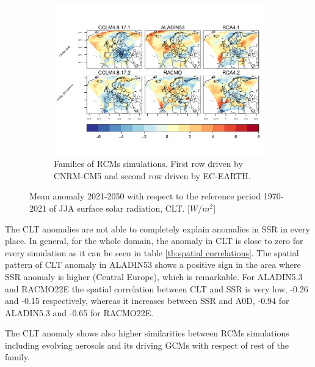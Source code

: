 \begin{figure}[h]
\begin{subfigure}{1\textwidth}
    \includegraphics[width=1\textwidth]{figs/capitulo7/ANOMALIAS_JJA_CLT_2050-2021_r12.pdf}
\caption{Families of RCMs simulations. First row driven by CNRM-CM5 and second row driven by EC-EARTH.}
\end{subfigure}
\caption{Mean anomaly 2021-2050 with respect to the reference period 1970-2021 of JJA surface solar radiation, CLT. [$W/m^2$]}
\label{fig:anomalyCLT}      
\end{figure}

The CLT anomalies are not able to completely explain anomalies in SSR in every place. In general, for the whole domain, the anomaly in CLT is close to zero for every simulation as it can be seen in table \ref{tb:spatial correlations}. The spatial pattern of CLT anomaly in ALADIN53 shows a positive sign in the area where SSR anomaly is higher (Central Europe), which is remarkable. For ALADIN5.3 and RACMO22E the spatial correlation between CLT and SSR is very low, -0.26 and -0.15 respectively, whereas it increases between SSR and A0D, -0.94 for ALADIN5.3 and -0.65 for RACMO22E.

The CLT anomaly shows also higher similarities between RCMs simulations including evolving aerosols and its driving GCMs with respect of rest of the family.



